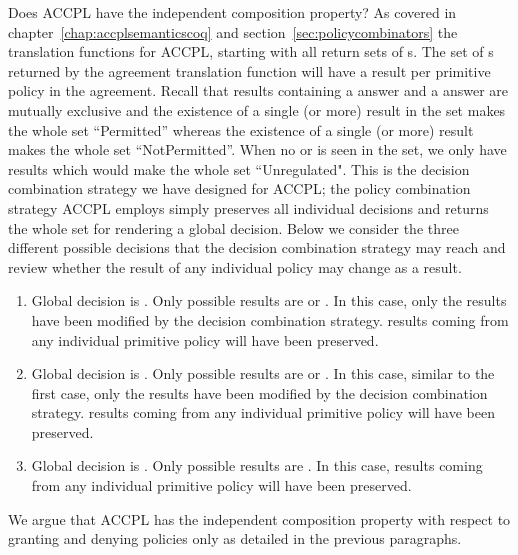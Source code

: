 Does \ac{ACCPL} have the independent composition property? As covered in chapter~\ref{chap:accplsemanticscoq} and section~\ref{sec:policycombinators} the translation functions for \ac{ACCPL}, starting with  all return sets of s. The set of s returned by the agreement translation function will have a result per primitive policy in the agreement. Recall that results containing a  answer and a  answer are mutually exclusive and the existence of a single (or more)  result in the set makes the whole set ``Permitted'' whereas the existence of a single (or more)  result makes the whole set ``NotPermitted''. When no  or  is seen in the set, we only have  results which would make the whole set ``Unregulated". This is the decision combination strategy we have designed for \ac{ACCPL}; the policy combination strategy \ac{ACCPL} employs simply preserves all individual decisions and returns the whole set for rendering a global decision. Below we consider the three different possible decisions that the decision combination strategy may reach and review whether the result of any individual policy may change as a result.

\begin{enumerate}
  \item Global decision is . Only possible results are  or . In this case, only the  results have been modified by the decision combination strategy.  results coming from any individual primitive policy will have been preserved.
  \item Global decision is . Only possible results are  or \newline {}. In this case, similar to the first case, only the  results have been modified by the decision combination strategy.  results coming from any individual primitive policy will have been preserved.
   \item Global decision is . Only possible results are . In this case, results coming from any individual primitive policy will have been preserved.
\end{enumerate}

We argue that \ac{ACCPL} has the independent composition property with respect to granting and denying policies only as detailed in the previous paragraphs. 

